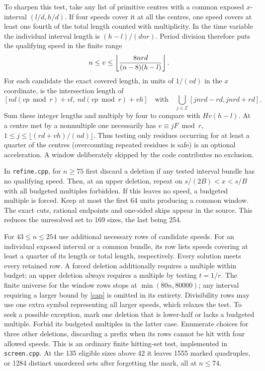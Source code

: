 To sharpen this test, take any list of primitive centres with a common exposed $x$-interval $(l/d,h/d)$. If four speeds cover it at all the centres, one speed covers at least one fourth of the total length counted with multiplicity. In the time variable the individual interval length is $(h-l)/(dnr)$. Period division therefore puts the qualifying speed in the finite range
\begin{equation}\label{cap}
 n\le v\le\left\lfloor {8nrd\over(n-8)(h-l)}\right\rfloor .
\end{equation}
For each candidate the exact covered length, in units of $1/(vd)$ in the $x$ coordinate, is the intersection length of
\[
 [nd(vp\bmod r)+vl,\ nd(vp\bmod r)+vh]
 \quad\text{with}\quad\bigcup_{j\in\mathbb Z}[jnrd-rd,jnrd+rd].
\]
Sum these integer lengths and multiply by four to compare with $Hv(h-l)$. At a centre met by a nonmultiple one necessarily has $v\equiv jF\bmod r$, $1\le j\le\lfloor(rd+v h)/(nd)\rfloor$. Thus testing only residues occurring for at least a quarter of the centres (overcounting repeated residues is safe) is an optional acceleration. A window deliberately skipped by the code contributes no exclusion.

In \texttt{refine.cpp}, for $n\ge75$ first discard a deletion if any tested interval bundle has no qualifying speed. Then, at an upper deletion, repeat on $s/(2B)<x<s/B$ with all budgeted multiples forbidden. If this leaves no speed, a budgeted multiple is forced. Keep at most the first 64 units producing a common window. The exact cuts, rational endpoints and one-sided skips appear in the source. This reduces the unresolved set to 169 sizes, the last being 254.

For $43\le n\le254$ use additional necessary rows of candidate speeds. For an individual exposed interval or a common bundle, its row lists speeds covering at least a quarter of its length or total length, respectively. Every solution meets every retained row. A forced deletion additionally requires a multiple within budget; an upper deletion always requires a multiple by testing $t=1/r$. The finite universe for the window rows stops at $\min(80n,80000)$; any interval requiring a larger bound by \eqref{cap} is omitted in its entirety. Divisibility rows may use one extra symbol representing all larger speeds, which relaxes the test. To seek a possible exception, mark one deletion that is lower-half or lacks a budgeted multiple. Forbid its budgeted multiples in the latter case. Enumerate choices for three other deletions, discarding a prefix when its rows cannot be hit with four allowed speeds. This is an ordinary finite hitting-set test, implemented in \texttt{screen.cpp}. At the 135 eligible sizes above 42 it leaves 1555 marked quadruples, or 1284 distinct unordered sets after forgetting the mark, all at $n\le74$.

